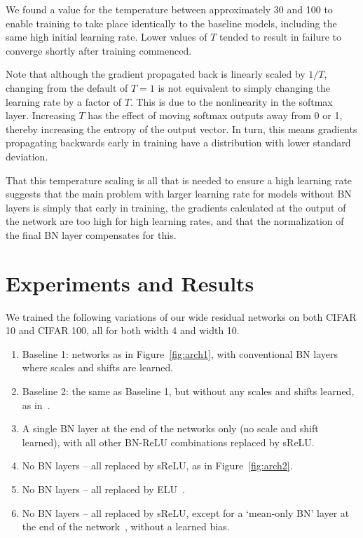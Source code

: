 \documentclass[conference]{IEEEtran}
\begin{document}
We found a value for the temperature between approximately 30 and 100 to enable training to take place identically to the baseline models, including the same high initial learning rate. Lower values of $T$ tended to result in failure to converge shortly after training commenced.

Note that although the gradient propagated back is linearly scaled by $1/T$, changing from the default of $T=1$ is not equivalent to simply changing the learning rate by a factor of $T$. This is due to the nonlinearity in the softmax layer. Increasing $T$ has the effect of moving softmax outputs away from 0 or 1, thereby increasing the entropy of the output vector. In turn, this means gradients propagating backwards early in training have a distribution with lower standard deviation.

That this temperature scaling is all that is needed to ensure a high learning rate suggests that the main problem with larger learning rate for models without BN layers is simply that early in training, the gradients calculated at the output of the network are too high for high learning rates, and that the normalization of the final BN layer compensates for this.  
















\section{Experiments and Results}\label{S4}

We trained the following variations of our wide residual networks on both CIFAR 10 and CIFAR 100, all for both width 4 and width 10. 
\begin{enumerate}
\item  Baseline 1: networks as in Figure~\ref{fig:arch1},  with conventional BN layers where scales and shifts are learned.
\item Baseline 2: the same as Baseline 1, but without any scales and shifts learned, as in~\cite{McDonnell.18}.
\item A single BN layer at the end of the networks only (no scale and shift learned), with all other BN-ReLU combinations replaced by sReLU.
\item No BN layers -- all replaced by sReLU, as in Figure~\ref{fig:arch2}.
\item No BN layers -- all replaced by ELU~\cite{Clevert.15}.
\item No BN layers -- all replaced by sReLU, except for a `mean-only BN' layer at the end of the network~\cite{Salimans_etal16a}, without a learned bias.
\end{enumerate}
\end{document}
